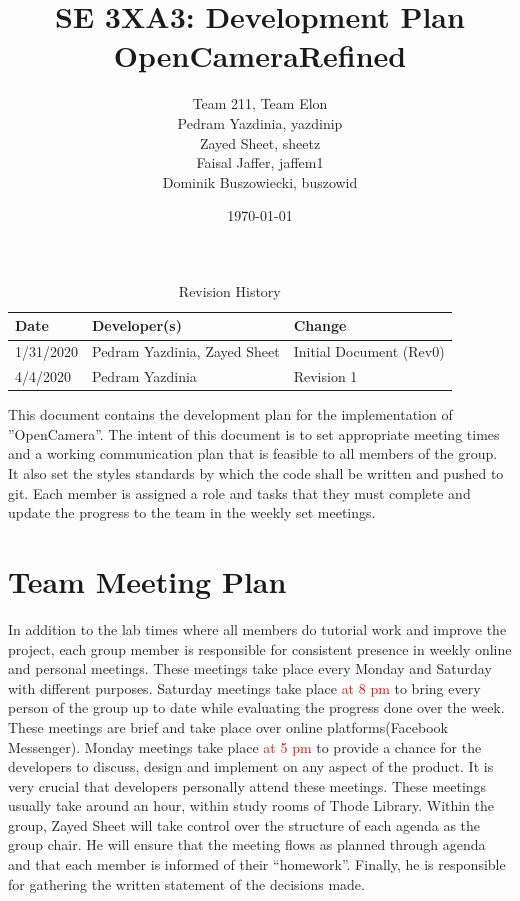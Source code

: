 \documentclass{article}
\title{SE 3XA3: Development Plan\\OpenCameraRefined}
\author{Team 211, Team Elon
		\\ Pedram Yazdinia, yazdinip
		\\ Zayed Sheet, sheetz
		\\ Faisal Jaffer, jaffem1
		\\ Dominik Buszowiecki, buszowid 
}
\date{\today}
\begin{document}
\begin{table}[hp]
\caption{Revision History} \label{TblRevisionHistory}
\begin{tabularx}{\textwidth}{llX}
\toprule
\textbf{Date} & \textbf{Developer(s)} & \textbf{Change}\\
\midrule
1/31/2020 & Pedram Yazdinia, Zayed Sheet & Initial Document (Rev0)\\
4/4/2020 & Pedram Yazdinia & Revision 1\\
\bottomrule
\end{tabularx}
\end{table}

\newpage

\maketitle


This document contains the development plan for the implementation of ''OpenCamera”. The intent of this document is to set appropriate meeting times and a working communication plan that is feasible to all members of the group. It also set the styles standards by which the code shall be written and pushed to git. Each member is assigned a role and tasks that they must complete and update the progress to the team in the weekly set meetings.


\section{Team Meeting Plan}

In addition to the lab times where all members do tutorial work and improve the project, each group member is responsible for consistent presence in weekly online and personal meetings. These meetings take place every Monday and Saturday with different purposes. Saturday meetings take place \textcolor{red}{at 8 pm }to bring every person of the group up to date while evaluating the progress done over the week. These meetings are brief and take place over online platforms(Facebook Messenger). Monday meetings take place \textcolor{red}{at 5 pm } to provide a chance for the developers to discuss, design and implement on any aspect of the product. It is very crucial that developers personally attend these meetings. These meetings usually take around an hour, within study rooms of Thode Library. Within the group, Zayed Sheet will take control over the structure of each agenda as the group chair. He will ensure that the meeting flows as planned through agenda and that each member is informed of their “homework”. Finally, he is responsible for gathering the written statement of the decisions made. 
\end{document}
